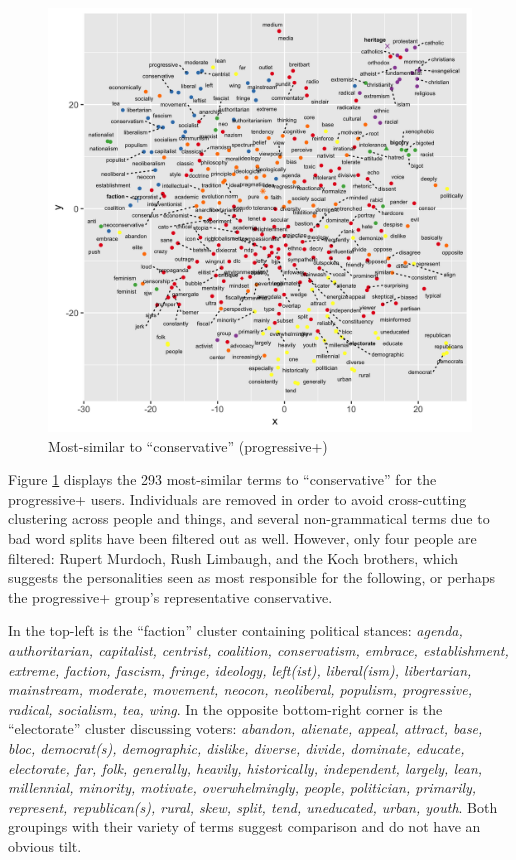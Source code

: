 \documentclass[doublespacing]{utdthesis}
\begin{document}
\begin{figure}[!ht]
\centering
\includegraphics[width=\textwidth]{2016/prog_plus_conservative}
\caption{Most-similar to ``conservative'' (progressive+)}
\label{fig:prog_plus_cons}
\end{figure}

Figure \ref{fig:prog_plus_cons} displays the 293 most-similar terms to ``conservative'' for the progressive+ users.
Individuals are removed in order to avoid cross-cutting clustering across people and things, and several non-grammatical terms due to bad word splits have been filtered out as well.
However, only four people are filtered: Rupert Murdoch, Rush Limbaugh, and the Koch brothers, which suggests the personalities seen as most responsible for the following, or perhaps the progressive+ group's representative conservative.

In the top-left is the ``faction'' cluster containing political stances: \emph{agenda, authoritarian, capitalist, centrist, coalition, conservatism, embrace, establishment, extreme, faction, fascism, fringe, ideology, left(ist), liberal(ism), libertarian, mainstream, moderate, movement, neocon, neoliberal, populism, progressive, radical, socialism, tea, wing}.
In the opposite bottom-right corner is the ``electorate'' cluster discussing voters: \emph{abandon, alienate, appeal, attract, base, bloc, democrat(s), demographic, dislike, diverse, divide, dominate, educate, electorate, far, folk, generally, heavily, historically, independent, largely, lean, millennial, minority, motivate, overwhelmingly, people, politician, primarily, represent, republican(s), rural, skew, split, tend, uneducated, urban, youth}.
Both groupings with their variety of terms suggest comparison and do not have an obvious tilt. 
\end{document}
